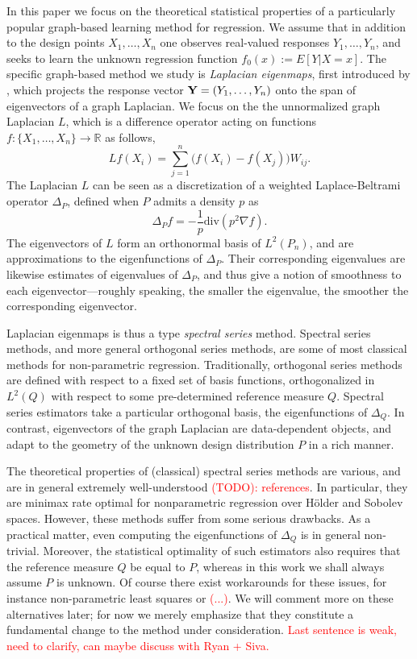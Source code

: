 \documentclass{article}
\newcommand{\Reals}{\mathbb{R}}
\newcommand{\1}{\mathbf{1}}
\theoremstyle{alden}
\theoremstyle{aldenthm}
\theoremstyle{definition}
\theoremstyle{remark}
\begin{document}
In this paper we focus on the theoretical statistical properties of a particularly popular graph-based learning method for regression. We assume that in addition to the design points $X_1,\ldots,X_n$ one observes real-valued responses $Y_1,\ldots,Y_n$, and seeks to learn the unknown regression function $f_0(x) := E[Y|X = x]$. The specific graph-based method we study is \emph{Laplacian eigenmaps}, first introduced by \cite{belkin03a}, which projects the response vector ${\bf Y} = (Y_1,\ldots,Y_n)$ onto the span of eigenvectors of a graph Laplacian. We focus on the the unnormalized graph Laplacian $L$, which is a difference operator acting on functions $f: \{X_1,\ldots,X_n\} \to \Reals$ as follows,
\begin{equation}
\label{eqn:graph_laplacian}
Lf(X_i) = \sum_{j = 1}^{n} \bigl(f(X_i) - f(X_j)\bigr)W_{ij}. 
\end{equation}
The Laplacian $L$ can be seen as a discretization of a weighted Laplace-Beltrami operator $\Delta_P$, defined when $P$ admits a density $p$ as
\begin{equation}
\label{eqn:fokker_planck_1}
\Delta_Pf= -\frac{1}{p} \mathrm{div}(p^2 \nabla f).
\end{equation}
The eigenvectors of $L$ form an orthonormal basis of $L^2(P_n)$, and are approximations to the eigenfunctions of $\Delta_P$. Their corresponding eigenvalues are likewise estimates of eigenvalues of $\Delta_P$, and thus give a notion of smoothness to each eigenvector---roughly speaking, the smaller the eigenvalue, the smoother the corresponding eigenvector. 

Laplacian eigenmaps is thus a type \emph{spectral series} method. Spectral series methods, and more general orthogonal series methods, are some of most classical methods for non-parametric regression. Traditionally, orthogonal series methods are defined with respect to a fixed set of basis functions, orthogonalized in $L^2(Q)$ with respect to some pre-determined reference measure $Q$. Spectral series estimators take a particular orthogonal basis, the eigenfunctions of $\Delta_Q$. In contrast, eigenvectors of the graph Laplacian are data-dependent objects, and adapt to the geometry of the unknown design distribution $P$ in a rich manner. 

The theoretical properties of (classical) spectral series methods are various, and are in general extremely well-understood \textcolor{red}{(TODO): references}. In particular, they are minimax rate optimal for nonparametric regression over H\"{o}lder and Sobolev spaces. However, these methods suffer from some serious drawbacks. As a practical matter, even computing the eigenfunctions of $\Delta_Q$ is in general non-trivial. Moreover, the statistical optimality of such estimators also requires that the reference measure $Q$ be equal to $P$, whereas in this work we shall always assume $P$ is unknown. Of course there exist workarounds for these issues, for instance non-parametric least squares or \textcolor{red}{(...)}. We will comment more on these alternatives later; for now we merely emphasize that they constitute a fundamental change to the method under consideration. \textcolor{red}{Last sentence is weak, need to clarify, can maybe discuss with Ryan + Siva.}
\end{document}
